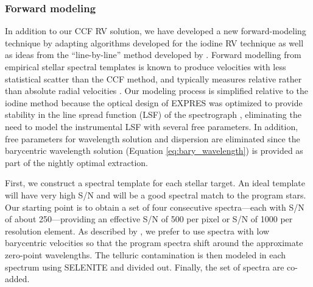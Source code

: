 \subsubsection{Forward modeling}
\label{pipeline:forward-modeling}

In addition to our CCF RV solution, we have developed a new forward-modeling technique by adapting algorithms developed for the iodine RV technique \citep{marcy_precision_1992, butler_attaining_1996} as well as ideas from the ``line-by-line'' method developed by \citet{dumusque_measuring_2018}. Forward modelling from empirical stellar spectral templates is known to produce velocities with less statistical scatter than the CCF method, and typically measures relative rather than absolute radial velocities \citep{anglada-escude_harps-terra_2012}. Our modeling process is simplified relative to the iodine method because the optical design of EXPRES was optimized to provide stability in the line spread function (LSF) of the spectrograph \citep{jurgenson_expres_2016, blackman_performance_2020}, eliminating the need to model the instrumental LSF with several free parameters. In addition, free parameters for wavelength solution and dispersion are eliminated since the barycentric wavelength solution (Equation \ref{eq:bary_wavelength}) is provided as part of the nightly optimal extraction.

First, we construct a spectral template for each stellar target. An ideal template will have very high S/N and will be a good spectral match to the program stars. Our starting point is to obtain a set of four consecutive spectra---each with S/N of about 250---providing an effective S/N of 500 per pixel or S/N of 1000 per resolution element. As described by \citet{dumusque_measuring_2018}, we prefer to use spectra with low barycentric velocities so that the program spectra shift around the approximate zero-point wavelengths. The telluric contamination is then modeled in each spectrum using SELENITE \citep{leet_toward_2019} and divided out. Finally, the set of spectra are co-added.

